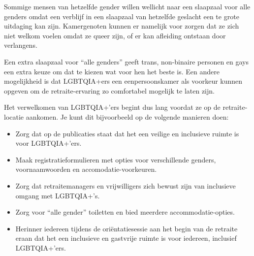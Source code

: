 \documentclass[12pt,openany]{book}
\begin{document}
Sommige mensen van hetzelfde gender willen wellicht naar een slaapzaal voor alle genders omdat een verblijf in een slaapzaal van hetzelfde geslacht een te grote uitdaging kan zijn. Kamergenoten kunnen er namelijk voor zorgen dat ze zich niet welkom voelen omdat ze queer zijn, of er kan afleiding ontstaan door verlangens.

Een extra slaapzaal voor “alle genders” geeft trans, non-binaire personen en gays een extra keuze om dat te kiezen wat voor hen het beste is. Een andere mogelijkheid is dat LGBTQIA+ers een eenpersoonskamer als voorkeur kunnen opgeven om de retraite-ervaring zo comfortabel mogelijk te laten zijn. 

Het verwelkomen van LGBTQIA+’ers begint dus lang voordat ze op de retraite-locatie aankomen. Je kunt dit bijvoorbeeld op de volgende manieren doen:

\begin{itemize}
  \setlength\itemsep{-0.3em}
  \item Zorg dat op de publicaties staat dat het een veilige en inclusieve ruimte is voor LGBTQIA+’ers.
  \item Maak registratieformulieren met opties voor verschillende genders, voornaamwoorden en accomodatie-voorkeuren.
  \item Zorg dat retraitemanagers en vrijwilligers zich bewust zijn van inclusieve omgang met LGBTQIA+’s.
  \item Zorg voor “alle gender” toiletten en bied meerdere accommodatie-opties.
  \item Herinner iedereen tijdens de oriëntatiesessie aan het begin van de retraite eraan dat het een inclusieve en gastvrije ruimte is voor iedereen, inclusief LGBTQIA+’ers.
\end{itemize}

\begin{figure}[h]
    \centering
\end{figure}
\end{document}
